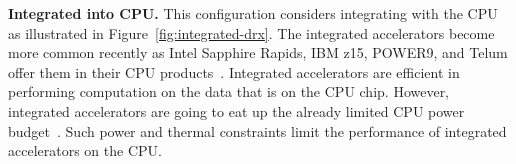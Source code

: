 \noindent \textbf{Integrated \drx into CPU.}
This configuration considers integrating \drx with the CPU as illustrated in Figure~\ref{fig:integrated-drx}. 
%
The integrated accelerators become more common recently as Intel Sapphire Rapids, IBM z15, POWER9, and Telum offer them in their CPU products~\cite{intel-sapphire-rapids:hotchips:2021,ibm-compression-accelerator:isca:2020,ibm-telum-processor:isca:2022}.
%
Integrated accelerators are efficient in performing computation on the data that is on the CPU chip. However, integrated accelerators are going to eat up the already limited CPU power budget~\cite{dark_silicon_isca2011,dark_silicon:babak}. 
%
Such power and thermal constraints limit the performance of integrated accelerators on the CPU.
%
%

